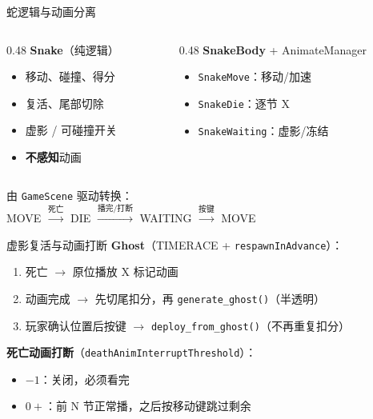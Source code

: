 \documentclass[aspectratio=169,13pt]{beamer}
\begin{document}
\begin{frame}{蛇逻辑与动画分离}
  \begin{columns}[T]
    \begin{column}{0.48\textwidth}
      \textbf{Snake}（纯逻辑）
      \begin{itemize}
        \item 移动、碰撞、得分
        \item 复活、尾部切除
        \item 虚影 / 可碰撞开关
        \item \textbf{不感知}动画
      \end{itemize}
    \end{column}
    \begin{column}{0.48\textwidth}
      \textbf{SnakeBody} + AnimateManager
      \begin{itemize}
        \item \texttt{SnakeMove}：移动/加速
        \item \texttt{SnakeDie}：逐节 X
        \item \texttt{SnakeWaiting}：虚影/冻结
      \end{itemize}
    \end{column}
  \end{columns}

  \vspace{0.5em}
  由 \texttt{GameScene} 驱动转换：\\
  MOVE $\xrightarrow{\text{死亡}}$ DIE $\xrightarrow{\text{播完/打断}}$ WAITING $\xrightarrow{\text{按键}}$ MOVE
\end{frame}

\begin{frame}{虚影复活与动画打断}
  \textbf{Ghost}（TIMERACE + \texttt{respawnInAdvance}）：
  \begin{enumerate}
    \item 死亡 $\rightarrow$ 原位播放 X 标记动画
    \item 动画完成 $\rightarrow$ 先切尾扣分，再 \texttt{generate\_ghost()}（半透明）
    \item 玩家确认位置后按键 $\rightarrow$ \texttt{deploy\_from\_ghost()}（不再重复扣分）
  \end{enumerate}

  \vspace{0.3em}
  \textbf{死亡动画打断}（\texttt{deathAnimInterruptThreshold}）：
  \begin{itemize}
    \item $-1$：关闭，必须看完
    \item $0+$：前 N 节正常播，之后按移动键跳过剩余
  \end{itemize}
\end{frame}
\end{document}
